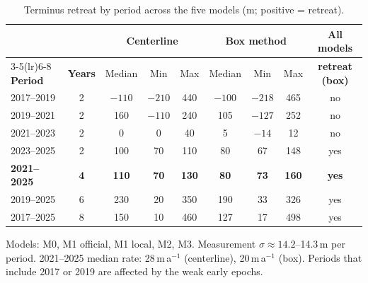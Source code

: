 \documentclass[10pt]{article}
\begin{document}
\begin{table}[p]
\centering\footnotesize
\setlength{\tabcolsep}{4pt}
\begin{threeparttable}
\caption{Terminus retreat by period across the five models (m; positive = retreat).}
\label{tab:terminus_periods}
\begin{tabular}{l c ccc ccc c}
\toprule
 & & \multicolumn{3}{c}{\textbf{Centerline}} & \multicolumn{3}{c}{\textbf{Box method}} & \textbf{All models} \\
\cmidrule(lr){3-5}\cmidrule(lr){6-8}
\textbf{Period} & \textbf{Years} & Median & Min & Max & Median & Min & Max & \textbf{retreat (box)} \\
\midrule
2017--2019 & 2 & $-110$ & $-210$ & 440 & $-100$ & $-218$ & 465 & no \\
2019--2021 & 2 & 160 & $-110$ & 240 & 105 & $-127$ & 252 & no \\
2021--2023 & 2 & 0 & 0 & 40 & 5 & $-14$ & 12 & no \\
2023--2025 & 2 & 100 & 70 & 110 & 80 & 67 & 148 & yes \\
\textbf{2021--2025} & \textbf{4} & \textbf{110} & \textbf{70} & \textbf{130} & \textbf{80} & \textbf{73} & \textbf{160} & \textbf{yes} \\
2019--2025 & 6 & 230 & 20 & 350 & 190 & 33 & 326 & yes \\
2017--2025 & 8 & 150 & 10 & 460 & 127 & 17 & 498 & yes \\
\bottomrule
\end{tabular}
\begin{tablenotes}\footnotesize
\item Models: M0, M1 official, M1 local, M2, M3. Measurement $\sigma \approx 14.2$--14.3\,m per
period. 2021--2025 median rate: 28\,m\,a$^{-1}$ (centerline), 20\,m\,a$^{-1}$ (box).
Periods that include 2017 or 2019 are affected by the weak early epochs.
\end{tablenotes}
\end{threeparttable}
\end{table}
\end{document}
